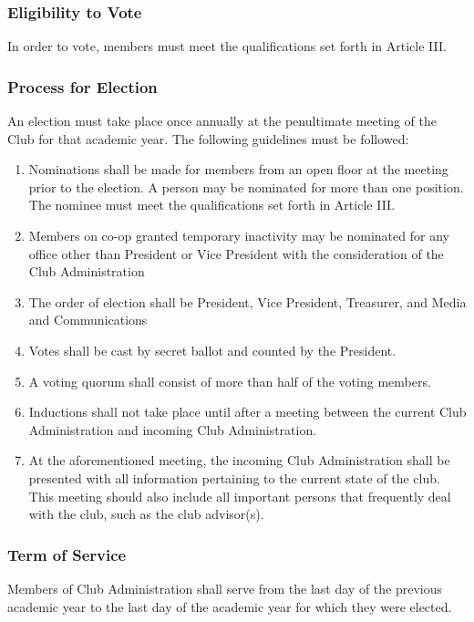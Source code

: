 \documentclass[english,11pt]{article}
\begin{document}
\subsubsection{Eligibility to Vote}
In order to vote, members must meet the qualifications set forth in Article III.

\subsubsection{Process for Election}
An election must take place once annually at the penultimate meeting of the Club for that academic year. The following guidelines must be followed:

\begin{enumerate}[label=\alph*.]
\item Nominations shall be made for members from an open floor at the meeting prior to the election.
      A person may be nominated for more than one position. The nominee must meet the qualifications set forth in Article III.
\item Members on co-op granted temporary inactivity may be nominated for any office other than President or Vice President with the consideration of the Club Administration
\item The order of election shall be President, Vice President, Treasurer, and Media and Communications
\item Votes shall be cast by secret ballot and counted by the President.
\item A voting quorum shall consist of more than half of the voting members.
\item Inductions shall not take place until after a meeting between the current Club Administration and incoming Club Administration.
\item At the aforementioned meeting, the incoming Club Administration shall be presented with all information pertaining to the current state of the club. 
      This meeting should also include all important persons that frequently deal with the club, such as the club advisor(s).
\end{enumerate}

\subsubsection{Term of Service}
Members of Club Administration shall serve from the last day of the previous academic year to the last day of the academic year for which they were elected.
\end{document}
